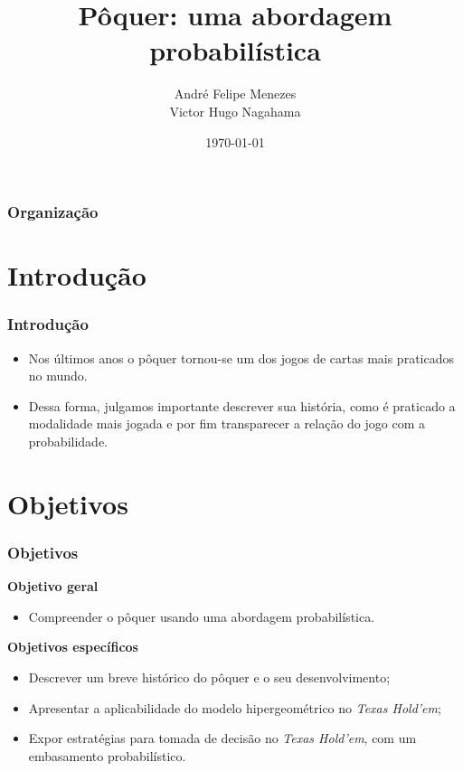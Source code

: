 \documentclass{beamer}
\title{Pôquer: uma abordagem probabilística} %
\author{André Felipe Menezes\\ Victor Hugo Nagahama} %
\institute[UEM] %
{
Departamento de Estatística -- Universidade Estadual de Maringá \\ %
\medskip
}
\date{\today} %
\begin{document}
\begin{frame}
\titlepage %
\end{frame}

\begin{frame}
\frametitle{Organização} %
\tableofcontents %
\end{frame}

\section{Introdução}
\begin{frame}
\frametitle{Introdução} 
\begin{itemize}
\item Nos últimos anos o pôquer tornou-se um dos jogos de cartas mais praticados no mundo. 

\item Dessa forma, julgamos importante descrever sua história, como é praticado a modalidade mais jogada e por fim transparecer a relação do jogo com a probabilidade.
\end{itemize}
\end{frame}

\section{Objetivos}
\begin{frame}
	\frametitle{Objetivos} 
\begin{center}
		{\Large \textbf{Objetivo geral}}
\end{center}
\begin{itemize}
	\item Compreender o pôquer usando uma abordagem probabilística.
\end{itemize}
	
\begin{center}
		{\Large \textbf{Objetivos específicos}}
\end{center}
\begin{itemize}
\item Descrever um breve histórico do pôquer e o seu desenvolvimento;
\item Apresentar a aplicabilidade do modelo hipergeométrico no \textit{Texas Hold'em};
\item Expor estratégias para tomada de decisão no \textit{Texas Hold'em}, com um embasamento probabilístico.
\end{itemize}
	
\end{frame}
\end{document}
